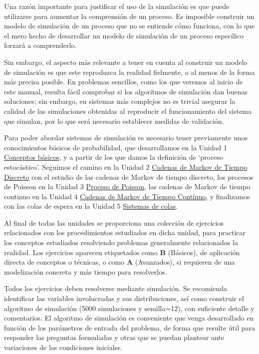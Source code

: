 \documentclass[
]{book}
\theoremstyle{definition}
\theoremstyle{definition}
\theoremstyle{definition}
\theoremstyle{definition}
\theoremstyle{remark}
\begin{document}
Una razón importante para justificar el uso de la simulación es que puede utilizarse para aumentar la comprensión de un proceso. Es imposible construir un modelo de simulación de un proceso que no se entiende cómo funciona, con lo que el mero hecho de desarrollar un modelo de simulación de un proceso especíﬁco forzará a comprenderlo.

Sin embargo, el aspecto más relevante a tener en cuenta al construir un modelo de simulación es que este reproduzca la realidad fielmente, o al menos de la forma más precisa posible. En problemas sencillos, como los que veremos al inicio de este manual, resulta fácil comprobar si los algoritmos de simulación dan buenas soluciones; sin embargo, en sistemas más complejos no es trivial asegurar la calidad de las simulaciones obtenidas al reproducir el funcionamiento del sistema que simulan, por lo que será necesario establecer medidas de validación.

Para poder abordar sistemas de simulación es necesario tener previamente unos conocimientos básicos de probabilidad, que desarrollamos en la Unidad 1 \protect\hyperlink{intro}{Conceptos básicos}, y a partir de los que damos la definición de `proceso estocástico'. Seguimos el camino en la Unidad 2 \protect\hyperlink{cmtd}{Cadenas de Markov de Tiempo Discreto} con el estudio de las cadenas de Markov de tiempo discreto, los procesos de Poisson en la Unidad 3 \protect\hyperlink{poissonprocess}{Proceso de Poisson}, las cadenas de Markov de tiempo continuo en la Unidad 4 \protect\hyperlink{CMTC}{Cadenas de Markov de Tiempo Contínuo}, y finalizamos con las colas de espera en la Unidad 5 \protect\hyperlink{COLAS}{Sistemas de colas}.

Al final de todas las unidades se proporciona una colección de ejercicios relacionados con los procedimientos estudiados en dicha unidad, para practicar los conceptos estudiados resolviendo problemas generalmente relacionados la realidad. Los ejercicios aparecen etiquetados como \textbf{B} (Básicos), de aplicación directa de conceptos o técnicas, o como \textbf{A} (Avanzados), si requieren de una modelización concreta y más tiempo para resolverlos.

Todos los ejercicios deben resolverse mediante simulación. Se recomienda identificar las variables involucradas y sus distribuciones, así como construir el algoritmo de simulación (5000 simulaciones y semilla=12), con suficiente detalle y comentarios. El algoritmo de simulación es conveniente que venga desarrollado en función de los parámetros de entrada del problema, de forma que resulte útil para responder las preguntas formuladas y otras que se puedan plantear ante variaciones de las condiciones iniciales.
\end{document}
